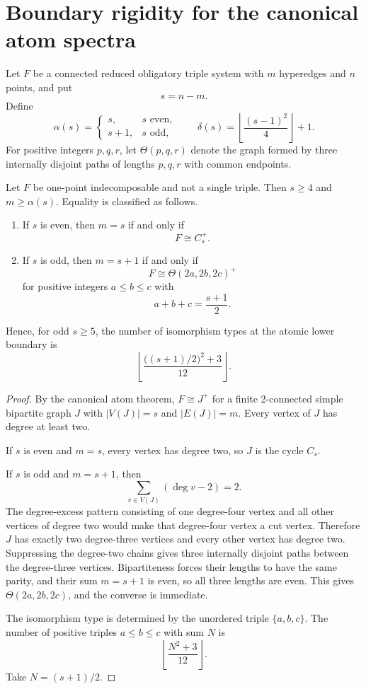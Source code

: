 \section{Boundary rigidity for the canonical atom spectra}

Let \(F\) be a connected reduced obligatory triple system with \(m\)
hyperedges and \(n\) points, and put
\[
 s=n-m.
\]
Define
\[
 \alpha(s)=
 \begin{cases}
 s,& s\text{ even},\\
 s+1,& s\text{ odd},
 \end{cases}
 \qquad
 \delta(s)=
 \left\lfloor\frac{(s-1)^2}{4}\right\rfloor+1.
\]
For positive integers \(p,q,r\), let \(\Theta(p,q,r)\) denote the graph
formed by three internally disjoint paths of lengths \(p,q,r\) with common
endpoints.

\begin{theorem}
Let \(F\) be one-point indecomposable and not a single triple.  Then
\(s\ge4\) and \(m\ge\alpha(s)\).  Equality is classified as follows.
\begin{enumerate}
\item If \(s\) is even, then \(m=s\) if and only if
\[
 F\cong C_s^+.
\]
\item If \(s\) is odd, then \(m=s+1\) if and only if
\[
 F\cong \Theta(2a,2b,2c)^+
\]
for positive integers \(a\le b\le c\) with
\[
 a+b+c=\frac{s+1}{2}.
\]
\end{enumerate}
Hence, for odd \(s\ge5\), the number of isomorphism types at the atomic lower
boundary is
\[
 \left\lfloor
 \frac{\bigl((s+1)/2\bigr)^2+3}{12}
 \right\rfloor.
\]
\end{theorem}

\begin{proof}
By the canonical atom theorem, \(F\cong J^+\) for a finite 2-connected simple
bipartite graph \(J\) with \(|V(J)|=s\) and \(|E(J)|=m\).  Every vertex of
\(J\) has degree at least two.

If \(s\) is even and \(m=s\), every vertex has degree two, so \(J\) is the
cycle \(C_s\).

If \(s\) is odd and \(m=s+1\), then
\[
 \sum_{v\in V(J)}(\deg v-2)=2.
\]
The degree-excess pattern consisting of one degree-four vertex and all other
vertices of degree two would make that degree-four vertex a cut vertex.
Therefore \(J\) has exactly two degree-three vertices and every other vertex
has degree two.  Suppressing the degree-two chains gives three internally
disjoint paths between the degree-three vertices.  Bipartiteness forces their
lengths to have the same parity, and their sum \(m=s+1\) is even, so all three
lengths are even.  This gives \(\Theta(2a,2b,2c)\), and the converse is
immediate.

The isomorphism type is determined by the unordered triple
\(\{a,b,c\}\).  The number of positive triples \(a\le b\le c\) with sum \(N\)
is
\[
 \left\lfloor\frac{N^2+3}{12}\right\rfloor.
\]
Take \(N=(s+1)/2\).
\end{proof}

